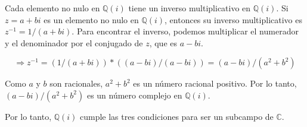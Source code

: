 Cada elemento no nulo en $\mathbb{Q}(i)$ tiene un inverso multiplicativo en $\mathbb{Q}(i)$. Si $z = a + bi$ es un elemento no nulo en $\mathbb{Q}(i)$, entonces su inverso multiplicativo es $z^{-1} = 1/(a+bi)$. Para encontrar el inverso, podemos multiplicar el numerador y el denominador por el conjugado de $z$, que es $a - bi$.

$$\Rightarrow z^{-1} = (1/(a+bi)) * ((a-bi)/(a-bi)) = (a - bi)/(a^{2} + b^{2})$$

Como $a$ y $b$ son racionales, $a^2 + b^2$ es un número racional positivo. Por lo tanto, $(a - bi)/(a^2 + b^2)$ es un número complejo en $\mathbb{Q}(i)$.

Por lo tanto, $\mathbb{Q}(i)$ cumple las tres condiciones para ser un subcampo de $\mathbb{C}$.
